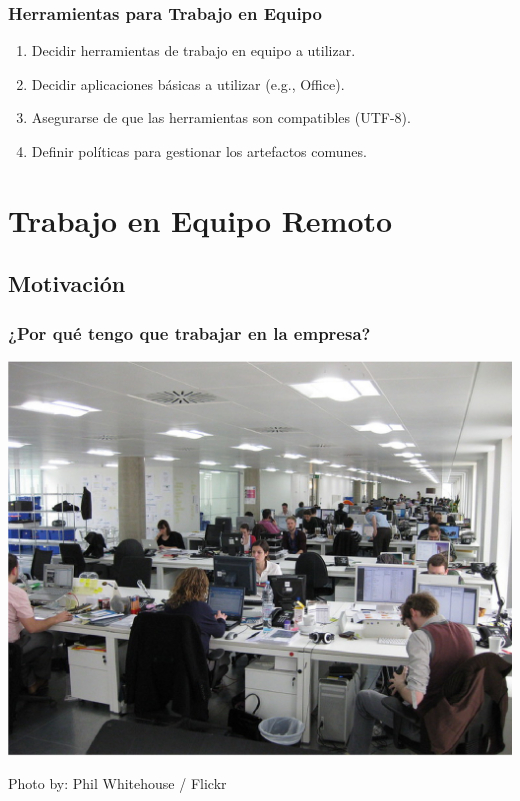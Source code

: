 \documentclass[a4paper,t,xcolor=pst,dvips]{beamer}
\begin{document}
\begin{frame}[c]
	\frametitle{Herramientas para Trabajo en Equipo}
	\begin{enumerate}[<+->]
		\item Decidir herramientas de trabajo en equipo a utilizar.
		\item Decidir aplicaciones básicas a utilizar (e.g., Office). 
		\item Asegurarse de que las herramientas son compatibles (UTF-8).
		\item Definir políticas para gestionar los artefactos comunes.
	\end{enumerate}
\end{frame}

\section{Trabajo en Equipo Remoto}

\subsection{Motivación}

\begin{frame}[c]
	\frametitle{¿Por qué tengo que trabajar en la empresa?}
	\begin{center}
		\includegraphics[width=0.75\linewidth,keepaspectratio=true]{images/motivacion01.eps}
	\end{center}
	\begin{flushright}
		\tiny{Photo by: Phil Whitehouse / Flickr}
	\end{flushright}
\end{frame}
\end{document}
